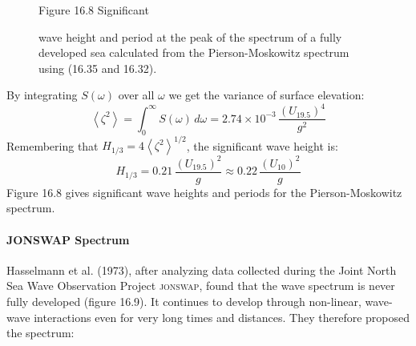 \begin{figure}[b!]
\vspace{-2ex}
\footnotesize
\centering
Figure 16.8 Significant \rule{0mm}{3ex}wave height and period at the
peak of the spectrum of a fully developed sea calculated from the
Pierson-Moskowitz spectrum using (16.35 and 16.32).

\label{fig:wavehtperiod}
\end{figure}

By integrating $S(\omega)$ over all $\omega$ we get the variance of
surface elevation:
\begin{equation}
\left<\zeta ^{2}\right> = \int_{0}^{\infty} S(\omega )\, d \omega = 2.74 \times
10^{-3}
\,\frac{\left(U_{19.5}
\right)^4}{g^2}
\end{equation}
Remembering that $H_{1/3} = 4 \left<\zeta ^{2}\right>^{1/2}$, the
significant wave height is:
\begin{equation}
H_{1/3} = 0.21 \, \frac{\left(U_{19.5} \right)^2}{g}\approx 0.22 \,
\frac{\left(U_{10} \right)^2}{g}
\end{equation}
Figure 16.8 gives significant wave heights and periods for the
Pierson-Moskowitz spectrum.

\paragraph{JONSWAP Spectrum}Hasselmann et al. (1973), after analyzing data
collected during the Joint North Sea Wave
Observation Project \textsc{jonswap}, found that the wave spectrum is
never fully developed (figure 16.9). It continues to develop through
non-linear, wave-wave interactions even for very long times and
distances. They therefore proposed the spectrum:

